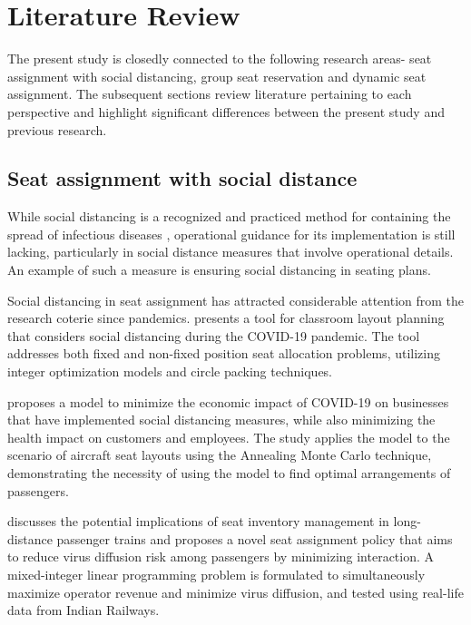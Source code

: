 \section{Literature Review}

The present study is closedly connected to the following research areas- seat assignment with social distancing, group seat reservation and dynamic seat assignment. The subsequent sections review literature pertaining to each perspective and highlight significant differences between the present study and previous research.

\subsection{Seat assignment with social distance}

While social distancing is a recognized and practiced method for containing the spread of infectious diseases \cite{moosa2020effectiveness}, operational guidance for its implementation is still lacking, particularly in social distance measures that involve operational details. An example of such a measure is ensuring social distancing in seating plans.

Social distancing in seat assignment has attracted considerable attention from the research coterie since pandemics.  \cite{bortolete2022support} presents a tool for classroom layout planning that considers social distancing during the COVID-19 pandemic. The tool addresses both fixed and non-fixed position seat allocation problems, utilizing integer optimization models and circle packing techniques.

\cite{ghorbani2020model} proposes a model to minimize the economic impact of COVID-19 on businesses that have implemented social distancing measures, while also minimizing the health impact on customers and employees. The study applies the model to the scenario of aircraft seat layouts using the Annealing Monte Carlo technique, demonstrating the necessity of using the model to find optimal arrangements of passengers.


\cite{haque2022optimization} discusses the potential implications of seat inventory management in long-distance passenger trains and proposes a novel seat assignment policy that aims to reduce virus diffusion risk among passengers by minimizing interaction. A mixed-integer linear programming problem is formulated to simultaneously maximize operator revenue and minimize virus diffusion, and tested using real-life data from Indian Railways. 


